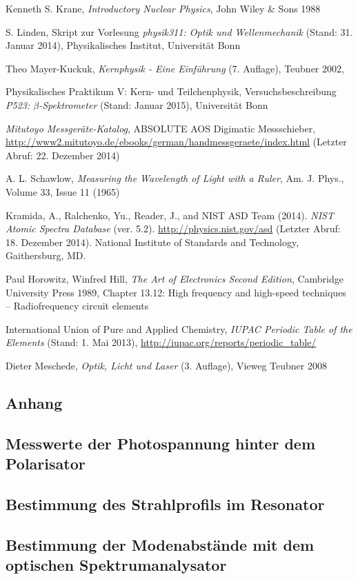 \documentclass[11pt, a4paper]{article}
\numberwithin{equation}{section}
\begin{document}
\clearpage
\vspace{\fill}
\begin{thebibliography}{19}
	Kenneth S. Krane,
	\emph{Introductory Nuclear Physics},
	John Wiley \& Sons 1988

	S. Linden,
	Skript zur Vorlesung \emph{physik311: Optik und Wellenmechanik} (Stand: 31. Januar 2014),
	Physikalisches Institut, Universität Bonn

	Theo Mayer-Kuckuk,
	\emph{Kernphysik - Eine Einführung} (7. Auflage),
	Teubner 2002,

	Physikalisches Praktikum V: Kern- und Teilchenphysik,
	Versuchsbeschreibung \emph{P523: $\beta$-Spektrometer} (Stand: Januar 2015),
	Universität Bonn
	
	\emph{Mitutoyo Messgeräte-Katalog},
	ABSOLUTE AOS Digimatic Messschieber,\\
	\url{http://www2.mitutoyo.de/ebooks/german/handmessgeraete/index.html} (Letzter Abruf: 22. Dezember 2014)	

	A. L. Schawlow,
	\emph{Measuring the Wavelength of Light with a Ruler},
	Am. J. Phys., Volume 33, Issue 11 (1965)

	Kramida, A., Ralchenko, Yu., Reader, J., and NIST ASD Team (2014).
	\emph{NIST Atomic Spectra Database} (ver. 5.2).
	\url{http://physics.nist.gov/asd} (Letzter Abruf: 18. Dezember 2014).
	National Institute of Standards and Technology, Gaithersburg, MD.
	
	Paul Horowitz, Winfred Hill,
	\emph{The Art of Electronics Second Edition},
	Cambridge University Press 1989,
	Chapter 13.12: High frequency and high-speed techniques -- Radiofrequency circuit elements

	International Union of Pure and Applied Chemistry,
	\emph{IUPAC Periodic Table of the Elements} (Stand: 1. Mai 2013),
	\url{http://iupac.org/reports/periodic_table/}

	Dieter Meschede,
	\emph{Optik, Licht und Laser} (3. Auflage),
	Vieweg Teubner 2008
	
	
 
\end{thebibliography}

\clearpage

\begin{appendix}
\section{Anhang}
\subsection{Messwerte der Photospannung hinter dem Polarisator}

\subsection{Bestimmung des Strahlprofils im Resonator}

\subsection{Bestimmung der Modenabstände mit dem optischen Spektrumanalysator}

\end{appendix}
\end{document}
